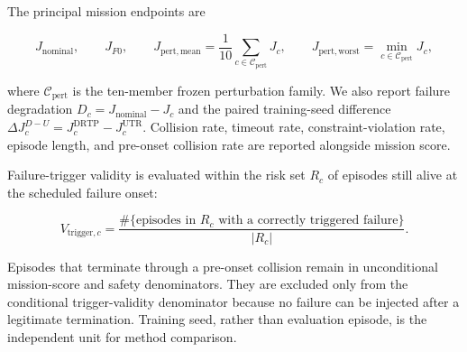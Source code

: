 The principal mission endpoints are

\[
J_{\mathrm{nominal}},\qquad J_{F0},\qquad
J_{\mathrm{pert,mean}}=\frac{1}{10}\sum_{c\in\mathcal C_{\mathrm{pert}}}J_c,\qquad
J_{\mathrm{pert,worst}}=\min_{c\in\mathcal C_{\mathrm{pert}}}J_c,
\]

where \(\mathcal C_{\mathrm{pert}}\) is the ten-member frozen perturbation family. We also report failure degradation \(D_c=J_{\mathrm{nominal}}-J_c\) and the paired training-seed difference \(\Delta J_c^{D-U}=J_c^{\mathrm{DRTP}}-J_c^{\mathrm{UTR}}\). Collision rate, timeout rate, constraint-violation rate, episode length, and pre-onset collision rate are reported alongside mission score.

Failure-trigger validity is evaluated within the risk set \(R_c\) of episodes still alive at the scheduled failure onset:

\[
V_{\mathrm{trigger},c}=
\frac{\#\{\text{episodes in }R_c\text{ with a correctly triggered failure}\}}
{|R_c|}.
\]

Episodes that terminate through a pre-onset collision remain in unconditional mission-score and safety denominators. They are excluded only from the conditional trigger-validity denominator because no failure can be injected after a legitimate termination. Training seed, rather than evaluation episode, is the independent unit for method comparison.